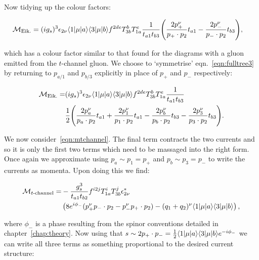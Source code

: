 		Now tidying up the colour factors:

		\begin{align}
		\begin{split}
			\mathcal{M}_{\text{Eik.}} = (ig_s)^3 \epsilon_{2\nu} \langle 1 | \mu | a \rangle \langle 3 | \mu | b \rangle
			f^{2de}T^b_{3b}T^e_{1a}\frac{1}{t_{a1}t_{b3}}\Bigg(&
			\frac{2p_+^\nu}{p_+\cdot p_2}t_{a1} - \frac{2p_-^\nu}{p_-\cdot p_2}t_{b3}\Bigg),
			\label{eq:fulltree3}
		\end{split}
		\end{align}

		which has a colour factor similar to that found for the diagrams with a gluon emitted from the
		$t$-channel gluon.  We choose to `symmetrise' eqn.~\eqref{eqn:fulltree3} by returning to $p_{a/1}$
		and $p_{b/3}$ explicitly in place of $p_+$ and $p_-$ respectively:

		\begin{align}
		\begin{split}
			\mathcal{M}_{\text{Eik.}} = &(ig_s)^3 \epsilon_{2\nu} \langle 1 | \mu | a \rangle \langle 3 | \mu | b \rangle f^{2de}T^b_{3b}T^e_{1a}\frac{1}{t_{a1}t_{b3}}\\
			&\frac{1}{2}\Bigg(\frac{2p_a^\nu}{p_a\cdot p_2}t_{a1} + \frac{2p_1^\nu}{p_1\cdot p_2}t_{a1} -
			\frac{2p_b^\nu}{p_b\cdot p_2}t_{b3} - \frac{2p_3^\nu}{p_3\cdot p_2}t_{b3}\Bigg).
			\label{eq:fulltree4}
		\end{split}
		\end{align}

		We now consider~\eqref{eqn:mtchannel}.  The final term contracts the two currents and so it is
		only the first two terms which need to be massaged into the right form.  Once again we
		approximate using $p_a\sim p_1=p_+$ and $p_b\sim p_3=p_-$ to write the currents as momenta.
		Upon doing this we find:

		\begin{align}
		\begin{split}
			\mathcal{M}_{t\text{-channel}} = &-\frac{g_s^3}{t_{a1}t_{b2}}f^{i2j}T^i_{1a}T^j_{3b} \epsilon^*_{2\nu} \\
			&\left(8e^{i\phi_-}(p_+^\nu p_-\cdot p_2 - p_-^\nu p_+\cdot p_2) - (q_1 + q_2)^\nu \langle 1 | \mu | a \rangle\langle 3 | \mu | b \rangle \right),
			\label{eqn:mtchannel2}
		\end{split}
		\end{align}

		where $\phi_-$ is a phase resulting from the spinor conventions detailed in chapter~\ref{chap:theory}.
		Now using that $s\sim2p_+\cdot p_-=\frac{1}{2}\langle 1 | \mu | a \rangle\langle 3 | \mu | b \rangle e^{-i\phi_-}$ we can write all
		three terms as something proportional to the desired current structure:

